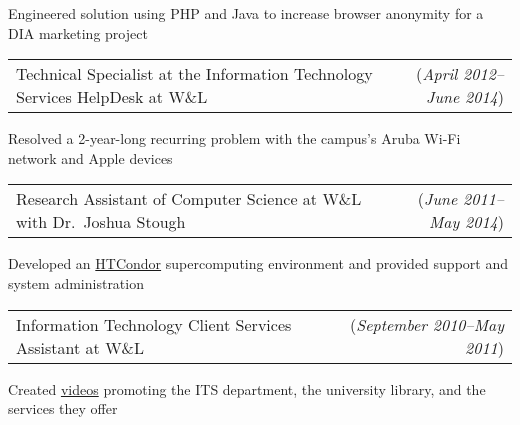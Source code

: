 \documentclass[11pt, letterpaper]{letter}
\makeatletter
\newlength{\indwidth}            \setlength{\indwidth}{\textwidth-.4in}
\newcommand{\dated}[2]{
    \begin{tabular*}{\indwidth}{l@{\extracolsep{\fill}}r}
        #1 & (\textit{#2})
    \end{tabular*}
}
\newcommand{\datedTwo}[3]{
    \begin{tabular*}{\indwidth}{l@{\extracolsep{\fill}}r}
        #1 & (\textit{#2}) (\textit{#3})
    \end{tabular*}
}
\newcommand{\HTCondor}{\href{https://htcondor.org/}{HTCondor}}
\makeatother
\begin{document}
\begin{compactitem}
        \begin{compactitem}
            \item Engineered solution using PHP and Java to increase browser anonymity for a DIA marketing project
        \end{compactitem}
    \item \dated{Technical Specialist at the Information Technology Services HelpDesk at W\&L}{April 2012--June 2014}
        \begin{compactitem}
        \item Resolved a 2-year-long recurring problem with the campus's Aruba Wi-Fi network and Apple devices
        \end{compactitem}
    \item \dated{Research Assistant of Computer Science at W\&L with Dr.\ Joshua Stough}{June 2011--May 2014}
        \begin{compactitem}
        \item Developed an \HTCondor{} supercomputing environment and provided support and system administration
        \end{compactitem}
    \item \dated{Information Technology Client Services Assistant at W\&L}{September 2010--May 2011}
        \begin{compactitem}
        \item Created \href{https://youtu.be/NvOarFOmly0}{videos} promoting the ITS department, the  university library,
            and the services they offer
        \end{compactitem}
    \iftoggle{smithbros}{%
        \item \datedTwo{%
                File Digitizer at Smith Brothers Abstract and Title Co.
            }{June 2009--August 2009}{June 2010--August 2010}
    }{}
\end{compactitem}


\end{document}
